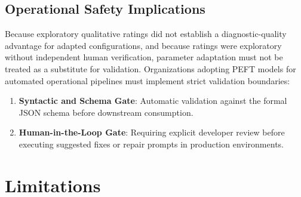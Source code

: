 \documentclass[11pt,a4paper]{article}
\begin{document}
\subsection{Operational Safety Implications}
Because exploratory qualitative ratings did not establish a diagnostic-quality advantage for adapted configurations, and because ratings were exploratory without independent human verification, parameter adaptation must not be treated as a substitute for validation. Organizations adopting PEFT models for automated operational pipelines must implement strict validation boundaries:
\begin{enumerate}
    \item \textbf{Syntactic and Schema Gate}: Automatic validation against the formal JSON schema before downstream consumption.
    \item \textbf{Human-in-the-Loop Gate}: Requiring explicit developer review before executing suggested fixes or repair prompts in production environments.
\end{enumerate}

\section{Limitations}
\end{document}
